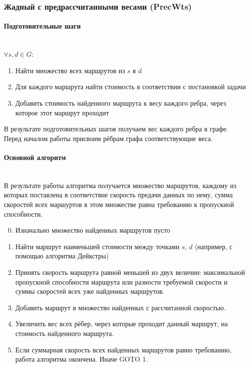\documentclass[a4paper]{article}
\begin{document}
\subsubsection{Жадный с предрассчитанными весами (PrecWts)} \label{pre_wts}
\paragraph{Подготовительные шаги}\mbox{}\\
$\forall s, d \in G: $
\begin{enumerate}
\item Найти множество всех маршрутов из $s$ в $d$
\item Для каждого маршрута найти стоимость в соответствии с постановкой задачи
\item Добавить стоимость найденного маршрута к весу каждого ребра, через которое этот маршрут проходит
\end{enumerate}
В результате подготовительных шагов получаем вес каждого ребра в графе. Перед началом работы присвоим рёбрам графа соответствующие веса.

\paragraph{Основной алгоритм}\mbox{}\\
В результате работы алгоритма получается множество маршрутов, каждому из которых поставлена в соответствие скорость предачи данных по нему, сумма скоростей всех маршуртов в этом множестве равна требованию к пропускной способности.
\begin{enumerate}
\setcounter{enumi}{-1}
\item Изначально множество найденных маршрутов пусто
\item Найти маршрут наименьшей стоимости между точками $s$, $d$ (например, с помощью алгоритма Дейкстры) 
\item Принять скорость маршрута равной меньшей из двух величин: максимальной пропускной способности маршрута или разности требуемой скорости и суммы скоростей всех уже найденных маршрутов.
\item Добавить маршрут в множество найденных с рассчитанной скоростью. 
\item Увеличить вес всех рёбер, через которые проходит данный маршрут, на стоимость найденного маршрута.
\item Если суммарная скорость всех найденных маршрутов равно требованию, работа алгоритма окончена. Иначе  GOTO 1.
\end{enumerate}
\end{document}
